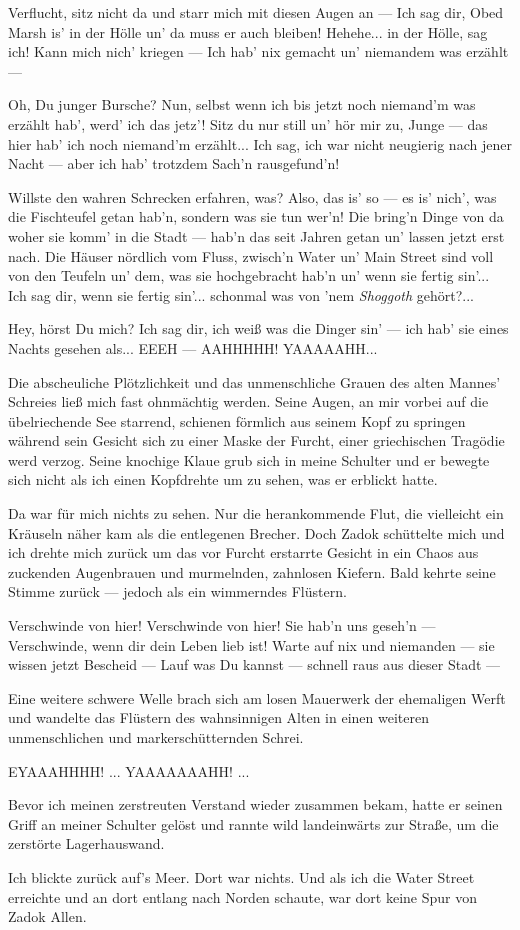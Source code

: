 \glqq Verflucht, sitz nicht da und starr mich mit diesen Augen an --- Ich sag dir, Obed Marsh is' in der Hölle un' da muss er auch bleiben! Hehehe... in der Hölle, sag ich! Kann mich nich' kriegen --- Ich hab' nix gemacht un' niemandem was erzählt ---

Oh, Du junger Bursche? Nun, selbst wenn ich bis jetzt noch niemand'm was erzählt hab', werd' ich das jetz'! Sitz du nur still un' hör mir zu, Junge --- das hier hab' ich noch niemand'm erzählt... Ich sag, ich war nicht neugierig nach jener Nacht --- aber ich hab' trotzdem Sach'n rausgefund'n!

Willste den wahren Schrecken erfahren, was? Also, das is' so --- es is' nich', was die Fischteufel getan hab'n, sondern was sie tun wer'n! Die bring'n Dinge von da woher sie komm' in die  Stadt --- hab'n das seit Jahren getan un' lassen jetzt erst nach. Die Häuser nördlich vom Fluss, zwisch'n Water un' Main Street sind voll von den Teufeln un' dem, was sie hochgebracht hab'n un' wenn sie fertig sin'... Ich sag dir, wenn sie fertig sin'... schonmal was von 'nem \textit{Shoggoth} gehört?...

Hey, hörst Du mich? Ich sag dir, ich weiß was die Dinger sin' --- ich hab' sie eines Nachts gesehen als... EEEH --- AAHHHHH! YAAAAAHH...
\grqq

Die abscheuliche Plötzlichkeit und das unmenschliche Grauen des alten Mannes' Schreies ließ mich fast ohnmächtig werden. Seine Augen, an mir vorbei auf die übelriechende See starrend, schienen förmlich aus seinem Kopf zu springen während sein Gesicht sich zu einer Maske der Furcht, einer griechischen Tragödie werd verzog. Seine knochige Klaue grub sich in meine Schulter und er bewegte sich nicht als ich einen Kopfdrehte um zu sehen, was er erblickt hatte.

Da war für mich nichts zu sehen. Nur die herankommende Flut, die vielleicht ein Kräuseln näher kam als die entlegenen Brecher. Doch Zadok schüttelte mich und ich drehte mich zurück um das vor Furcht erstarrte Gesicht in ein Chaos aus zuckenden Augenbrauen und murmelnden, zahnlosen Kiefern. Bald kehrte seine Stimme zurück --- jedoch als ein wimmerndes Flüstern.

\glqq Verschwinde von hier! Verschwinde von hier! Sie hab'n uns geseh'n --- Verschwinde, wenn dir dein Leben lieb ist! Warte auf nix und niemanden --- sie wissen jetzt Bescheid --- Lauf was Du kannst --- schnell raus aus dieser Stadt ---
\grqq

Eine weitere schwere Welle brach sich am losen Mauerwerk der ehemaligen Werft und wandelte das Flüstern des wahnsinnigen Alten in einen weiteren unmenschlichen und markerschütternden Schrei.

\glqq EYAAAHHHH! ... YAAAAAAAHH! ...\grqq

Bevor ich meinen zerstreuten Verstand wieder zusammen bekam, hatte er seinen Griff an meiner Schulter gelöst und rannte wild landeinwärts zur Straße, um die zerstörte Lagerhauswand.

Ich blickte zurück auf's Meer. Dort war nichts. Und als ich die Water Street erreichte und an dort entlang nach Norden schaute, war dort keine Spur von Zadok Allen.
